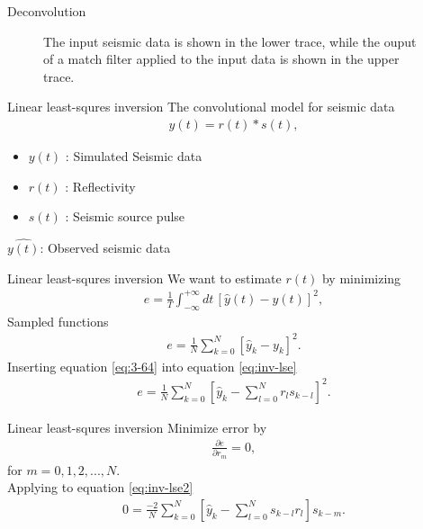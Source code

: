 \documentclass[xcolor=dvipsnames,notes]{beamer}
\begin{document}
%
%
\begin{frame}{Deconvolution}
\begin{figure}[h]
\caption{The input seismic data is shown in the lower trace, while the
         ouput of a match filter applied to the input data
         is shown in the upper trace.}
\label{fig:fdecon4}
\end{figure}
\end{frame}
\begin{frame}{Linear least-squres inversion}
The convolutional model for seismic data
%
\begin{eqnarray}
y(t) = r(t)*s(t),
   \label{eq:inv-convmod}
\end{eqnarray}
%
\begin{itemize}
  \item $y(t)$ : Simulated Seismic data
  \item $r(t)$ : Reflectivity
  \item $s(t)$ : Seismic source pulse
\end{itemize}
$\hat{y(t)}$: Observed seismic data 
\end{frame}
\begin{frame}{Linear least-squres inversion}
%
We want to estimate $r(t)$ by minimizing 
\begin{eqnarray}
  e = \frac{1}{T}\int^{+\infty}_{-\infty}dt\, [\hat{y}(t)-y(t)]^2,
\end{eqnarray}
%
Sampled functions
\begin{eqnarray}
  e = \frac{1}{N}\sum^{N}_{k=0} [\hat{y}_k-y_k]^2.
                       \label{eq:inv-lse}
\end{eqnarray}
%
Inserting equation \eqref{eq:3-64} into equation \eqref{eq:inv-lse} 
%
\begin{eqnarray}
  e = \frac{1}{N}\sum^{N}_{k=0} [\hat{y}_k-\sum^N_{l=0} r_l s_{k-l}]^2.
                       \label{eq:inv-lse2}
\end{eqnarray}
%
\end{frame}
%
\begin{frame}{Linear least-squres inversion}
Minimize error by 
%
\begin{eqnarray}
  \frac{\partial e}{\partial r_m} = 0,
            \label{eq:inv-opt}
\end{eqnarray}
for $m=0,1,2,...,N$.\\
Applying  to equation \eqref{eq:inv-lse2}
%
\begin{eqnarray}
0 = \frac{-2}{N}\sum^N_{k=0}\left[\hat{y}_k-\sum^N_{l=0} s_{k-l} r_l\right] s_{k-m}.
            \label{eq:inv-err2}
\end{eqnarray}
\end{frame}
\end{document}
